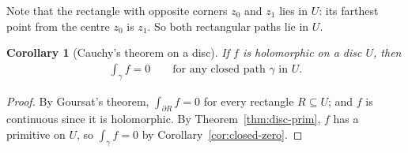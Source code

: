 \documentclass[11pt]{article}
\theoremstyle{plain}
\newtheorem{corollary}[theorem]{Corollary}
\theoremstyle{definition}
\theoremstyle{remark}
\numberwithin{equation}{section}
\newcommand{\be}{\begin{eqnarray}}
\newcommand{\ee}{\end{eqnarray}}
\begin{document}
\begin{center}
\end{center}

Note that the rectangle with opposite corners $z_0$ and $z_1$ lies in $U$:
its farthest point from the centre $z_0$ is $z_1$. So both rectangular
paths lie in $U$.

\begin{corollary}[Cauchy's theorem on a disc]
\label{cor:cauchy-disc}
If $f$ is holomorphic on a disc $U$, then
\be
 \int_\gamma f=0\qquad\text{for any closed path $\gamma$ in $U$.}
\ee
\end{corollary}

\begin{proof}
By Goursat's theorem, $\int_{\partial R}f=0$ for every rectangle
$R\subseteq U$; and $f$ is continuous since it is holomorphic. By
Theorem~\ref{thm:disc-prim}, $f$ has a primitive on $U$, so
$\int_\gamma f=0$ by Corollary~\ref{cor:closed-zero}.
\end{proof}
\end{document}
